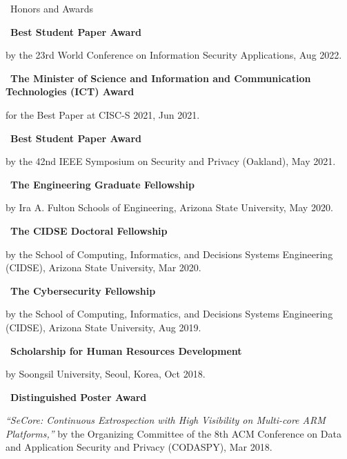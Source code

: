 \documentclass{resume} %
\begin{document}
\begin{rSection}{\faGenderless~Honors and Awards}
    \strut\textbullet~{\bf Best Student Paper Award}\\
    \strut\hspace{1cm}\parbox[t]{\linegoal}{by the 23rd World Conference on Information Security Applications, Aug 2022.}
	
    \strut\textbullet~{\bf The Minister of Science and Information and Communication Technologies (ICT) Award}\\
    \strut\hspace{1cm}\parbox[t]{\linegoal}{for the Best Paper at CISC-S 2021, Jun 2021.}

	\strut\textbullet~{\bf Best Student Paper Award}\\
    \strut\hspace{1cm}\parbox[t]{\linegoal}{by the 42nd IEEE Symposium on Security and Privacy (Oakland), May 2021.}

    \strut\textbullet~{\bf The Engineering Graduate Fellowship}\\
    \strut\hspace{1cm}\parbox[t]{\linegoal}{by Ira A. Fulton Schools of Engineering, Arizona State University, May 2020.}

    \strut\textbullet~{\bf The CIDSE Doctoral Fellowship}\\
    \strut\hspace{1cm}\parbox[t]{\linegoal}{by the School of Computing, Informatics, and Decisions Systems Engineering (CIDSE), Arizona State University, Mar 2020.}

    \strut\textbullet~{\bf The Cybersecurity Fellowship}\\
    \strut\hspace{1cm}\parbox[t]{\linegoal}{by the School of Computing, Informatics, and Decisions Systems Engineering (CIDSE), Arizona State University, Aug 2019.}

	\strut\textbullet~{\bf Scholarship for Human Resources Development}\\
	\strut\hspace{1cm}by Soongsil University, Seoul, Korea, Oct 2018.

	\strut\textbullet~{\bf Distinguished Poster Award}\\
	\strut\hspace{1cm}\parbox[t]{\linegoal}{\emph{``SeCore: Continuous Extrospection with High Visibility on Multi-core ARM Platforms,''} by the Organizing Committee of the 8th ACM Conference on Data and Application Security and Privacy (CODASPY), Mar 2018.}


\end{rSection}
\end{document}
